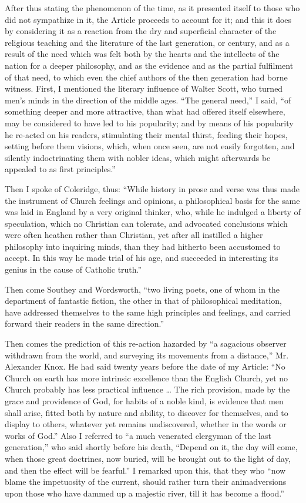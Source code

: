 After thus stating the phenomenon of the time, as it presented itself to
those who did not sympathize in it, the Article proceeds to account for
it; and this it does by considering it as a reaction from the dry and
superficial character of the religious teaching and the literature of
the last generation, or century, and as a result of the need which was
felt both by the hearts and the intellects of the nation for a deeper
philosophy, and as the evidence and as the partial fulfilment of that
need, to which even the chief authors of the then generation had borne
witness. First, I mentioned the literary influence of Walter Scott, who
turned men's minds in the direction of the middle ages.
``The general need,'' I said, ``of something deeper and more
attractive, than what had offered itself elsewhere, may be considered to
have led to his popularity; and by means of his popularity he re-acted on
his readers, stimulating their mental thirst, feeding their hopes,
setting before them visions, which, when once seen, are not easily
forgotten, and silently indoctrinating them with nobler ideas, which
might afterwards be appealed to as first principles.''

Then I spoke of Coleridge, thus: ``While history in prose and
verse was thus made the instrument of Church feelings and opinions, a
philosophical basis for the same was laid in England by a very original
thinker, who, while he indulged a liberty of speculation, which no
Christian can tolerate, and advocated conclusions which were often
heathen rather than Christian, yet after all instilled a higher
philosophy into inquiring minds, than they had hitherto been accustomed
to accept. In this way he made trial of his age, and succeeded in
interesting its genius in the cause of Catholic truth.''

Then come Southey and Wordsworth, ``two living poets, one of whom
in the department of fantastic fiction, the other in that of
philosophical meditation, have addressed themselves to the same high
principles and feelings, and carried forward their readers in the same
direction.''

Then comes the prediction of this re-action hazarded by ``a
sagacious observer withdrawn from the world, and surveying its movements
from a distance,'' Mr. Alexander Knox. He had said twenty years
before the date of my Article: ``No Church on earth has
more intrinsic excellence than the English Church, yet no Church
probably has less practical influence … The rich provision, made by
the grace and providence of God, for habits of a noble kind, is evidence
that men shall arise, fitted both by nature and ability, to discover for
themselves, and to display to others, whatever yet remains undiscovered,
whether in the words or works of God.'' Also I referred to ``a
much venerated clergyman of the last generation,'' who said shortly
before his death, ``Depend on it, the day will come, when those
great doctrines, now buried, will be brought out to the light of day,
and then the effect will be fearful.'' I remarked upon this, that
they who ``now blame the impetuosity of the current, should rather
turn their animadversions upon those who have dammed up a majestic
river, till it has become a flood.''


